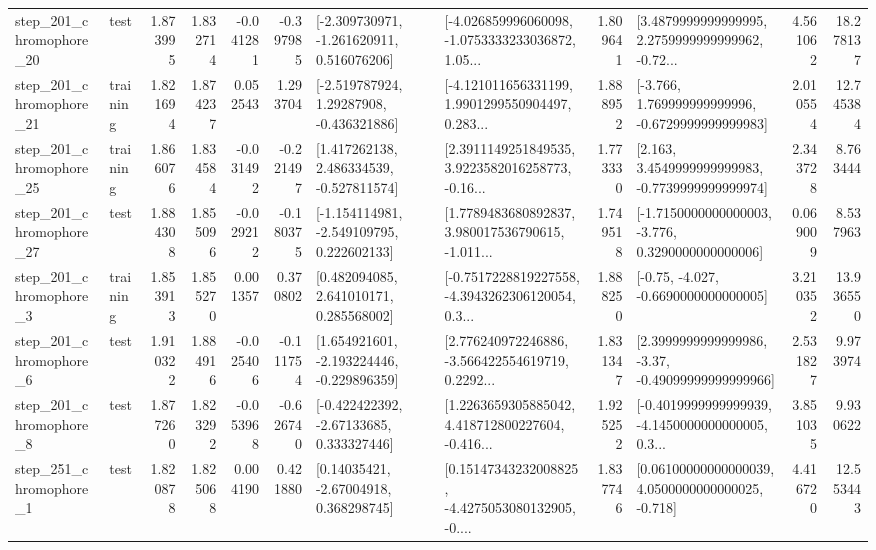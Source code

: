 \begin{tabular}{llrrrrllrlrr}
  step\_201\_chromophore\_20 &      test &      1.873995 &    1.832714 &     -0.041281 & -0.397985 &   [-2.309730971, -1.261620911, 0.516076206] &  [-4.026859996060098, -1.0753333233036872, 1.05... &       1.809641 &  [3.4879999999999995, 2.2759999999999962, -0.72... &            4.561062 &         18.278137 \\
  step\_201\_chromophore\_21 &  training &      1.821694 &    1.874237 &      0.052543 &  1.293704 &    [-2.519787924, 1.29287908, -0.436321886] &  [-4.121011656331199, 1.9901299550904497, 0.283... &       1.888952 &   [-3.766, 1.769999999999996, -0.6729999999999983] &            2.010554 &         12.745384 \\
  step\_201\_chromophore\_25 &  training &      1.866076 &    1.834584 &     -0.031492 & -0.221497 &    [1.417262138, 2.486334539, -0.527811574] &  [2.3911149251849535, 3.9223582016258773, -0.16... &       1.773330 &   [2.163, 3.4549999999999983, -0.7739999999999974] &            2.343728 &          8.763444 \\
  step\_201\_chromophore\_27 &      test &      1.884308 &    1.855096 &     -0.029212 & -0.180375 &   [-1.154114981, -2.549109795, 0.222602133] &  [1.7789483680892837, 3.980017536790615, -1.011... &       1.749518 &  [-1.7150000000000003, -3.776, 0.3290000000000006] &            0.069009 &          8.537963 \\
   step\_201\_chromophore\_3 &  training &      1.853913 &    1.855270 &      0.001357 &  0.370802 &     [0.482094085, 2.641010171, 0.285568002] &  [-0.7517228819227558, -4.3943262306120054, 0.3... &       1.888250 &               [-0.75, -4.027, -0.6690000000000005] &            3.210352 &         13.936550 \\
   step\_201\_chromophore\_6 &      test &      1.910322 &    1.884916 &     -0.025406 & -0.111754 &   [1.654921601, -2.193224446, -0.229896359] &  [2.776240972246886, -3.566422554619719, 0.2292... &       1.831347 &  [2.3999999999999986, -3.37, -0.49099999999999966] &            2.531827 &          9.973974 \\
   step\_201\_chromophore\_8 &      test &      1.877260 &    1.823292 &     -0.053968 & -0.626740 &    [-0.422422392, -2.67133685, 0.333327446] &  [1.2263659305885042, 4.418712800227604, -0.416... &       1.925252 &  [-0.4019999999999939, -4.1450000000000005, 0.3... &            3.851035 &          9.930622 \\
   step\_251\_chromophore\_1 &      test &      1.820878 &    1.825068 &      0.004190 &  0.421880 &      [0.14035421, -2.67004918, 0.368298745] &  [0.15147343232008825, -4.4275053080132905, -0.... &       1.837746 &  [0.06100000000000039, 4.0500000000000025, -0.718] &            4.416720 &         12.553443 \\

\end{tabular}
